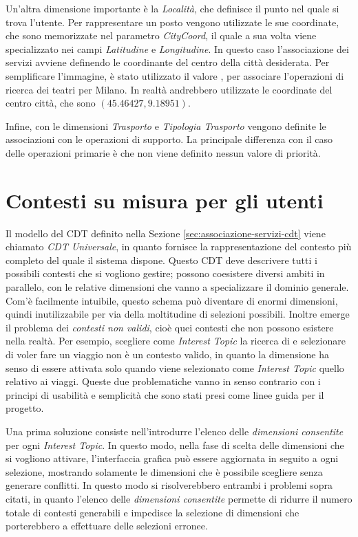 Un'altra dimensione importante è la \emph{Località}, che definisce il punto nel quale si trova l'utente. Per rappresentare un posto vengono utilizzate le sue coordinate, che sono memorizzate nel parametro \emph{CityCoord}, il quale a sua volta viene specializzato nei campi \emph{Latitudine} e \emph{Longitudine}. In questo caso l'associazione dei servizi avviene definendo le coordinante del centro della città desiderata. Per semplificare l'immagine, è stato utilizzato il valore , per associare l'operazioni di ricerca dei teatri per Milano. In realtà andrebbero utilizzate le coordinate del centro città, che sono $ (45.46427, 9.18951) $.

Infine, con le dimensioni \emph{Trasporto} e \emph{Tipologia Trasporto} vengono definite le associazioni con le operazioni di supporto. La principale differenza con il caso delle operazioni primarie è che non viene definito nessun valore di priorità.

\section{Contesti su misura per gli utenti\label{sec:cdt-su-misura}}

Il modello del CDT definito nella Sezione \ref{sec:associazione-servizi-cdt} viene chiamato \emph{CDT Universale}, in quanto fornisce la rappresentazione del contesto più completo del quale il sistema dispone. Questo CDT deve descrivere tutti i possibili contesti che si vogliono gestire; possono coesistere diversi ambiti in parallelo, con le relative dimensioni che vanno a specializzare il dominio generale. Com'è facilmente intuibile, questo schema può diventare di enormi dimensioni, quindi inutilizzabile per via della moltitudine di selezioni possibili. Inoltre emerge il problema dei \emph{contesti non validi}, cioè quei contesti che non possono esistere nella realtà. Per esempio, scegliere come \emph{Interest Topic} la ricerca di  e selezionare di voler fare un viaggio  non è un contesto valido, in quanto la dimensione  ha senso di essere attivata solo quando viene selezionato come \emph{Interest Topic} quello relativo ai viaggi. Queste due problematiche vanno in senso contrario con i principi di usabilità e semplicità che sono stati presi come linee guida per il progetto.

Una prima soluzione consiste nell'introdurre l'elenco delle \emph{dimensioni consentite} per ogni \emph{Interest Topic}. In questo modo, nella fase di scelta delle dimensioni che si vogliono attivare, l'interfaccia grafica può essere aggiornata in seguito a ogni selezione, mostrando solamente le dimensioni che è possibile scegliere senza generare conflitti. In questo modo si risolverebbero entrambi i problemi sopra citati, in quanto l'elenco delle \emph{dimensioni consentite} permette di ridurre il numero totale di contesti generabili e impedisce la selezione di dimensioni che porterebbero a effettuare delle selezioni erronee.

